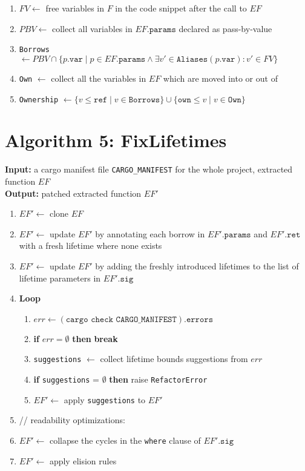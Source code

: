 \documentclass{article}
\begin{document}
\begin{enumerate}
    \item $FV \leftarrow$ free variables in $F$ in the code snippet after the call to $EF$
    \item $PBV \leftarrow$ collect all variables in $EF.\texttt{params}$ declared as pass-by-value
    \item \texttt{Borrows} $\leftarrow PBV \cap \{ p.\texttt{var} \mid p \in EF.\texttt{params} \land \exists v' \in \texttt{Aliases}(p.\texttt{var}) : v' \in FV \}$
    \item \texttt{Own} $\leftarrow$ collect all the variables in $EF$ which are moved into or out of
    \item \texttt{Ownership} $\leftarrow \{ v \leq \texttt{ref} \mid v \in \texttt{Borrows} \} \cup \{ \texttt{own} \leq v \mid v \in \texttt{Own} \}$
\end{enumerate}

\newpage

\section{Algorithm 5: FixLifetimes}
\textbf{Input:} a cargo manifest file \texttt{CARGO\_MANIFEST} for the whole project, extracted function $EF$ \\
\textbf{Output:} patched extracted function $EF'$

\begin{enumerate}
    \item $EF' \leftarrow$ clone $EF$
    \item $EF' \leftarrow$ update $EF'$ by annotating each borrow in $EF'.\texttt{params}$ and $EF'.\texttt{ret}$ with a fresh lifetime where none exists
    \item $EF' \leftarrow$ update $EF'$ by adding the freshly introduced lifetimes to the list of lifetime parameters in $EF'.\texttt{sig}$
    \item \textbf{Loop}
    \begin{enumerate}
        \item $err \leftarrow (\texttt{cargo check CARGO\_MANIFEST}).\texttt{errors}$
        \item \textbf{if} $err = \emptyset$ \textbf{then} \textbf{break}
        \item \texttt{suggestions} $\leftarrow$ collect lifetime bounds suggestions from $err$
        \item \textbf{if} \texttt{suggestions} = $\emptyset$ \textbf{then} raise \texttt{RefactorError}
        \item $EF' \leftarrow$ apply \texttt{suggestions} to $EF'$
    \end{enumerate}
    \item // readability optimizations:
    \item $EF' \leftarrow$ collapse the cycles in the \texttt{where} clause of $EF'.\texttt{sig}$
    \item $EF' \leftarrow$ apply elision rules
\end{enumerate}
\end{document}
